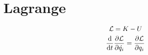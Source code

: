 \documentclass[../main.tex]{subfiles}
\begin{document}
\section{Lagrange}

\[
  \mathcal{L} = K - U
\]
\[
  \dv{t}\pdv{\mathcal{L}}{\dot{q_i}}=\pdv{\mathcal{L}}{q_i}
\]
\end{document}
